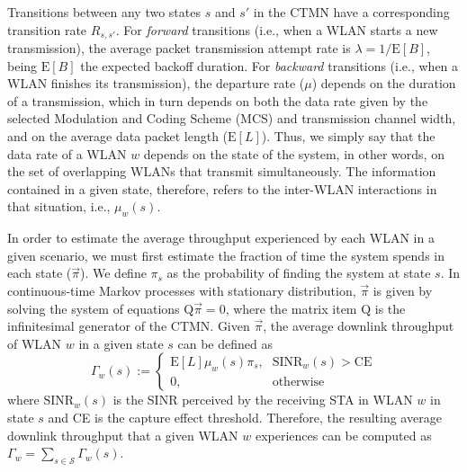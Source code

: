 \documentclass[preprint,12pt]{elsarticle}
\begin{document}
Transitions between any two states $s$ and $s'$ in the CTMN have a corresponding transition rate $R_{s,s'}$. For \textit{forward} transitions (i.e., when a WLAN starts a new transmission), the average packet transmission attempt rate is $\lambda = 1/\text{E}[B]$, being $\text{E}[B]$ the expected backoff duration. For \textit{backward} transitions (i.e., when a WLAN finishes its transmission), the departure rate ($\mu$) depends on the duration of a transmission, which in turn depends on both the data rate given by the selected Modulation and Coding Scheme (MCS) and transmission channel width, and on the average data packet length ($\text{E}[L]$). Thus, we simply say that the data rate of a WLAN $w$ depends on the state of the system, in other words, on the set of overlapping WLANs that transmit simultaneously. The information contained in a given state, therefore, refers to the inter-WLAN interactions in that situation, i.e., $\mu_w(s)$.

In order to estimate the average throughput experienced by each WLAN in a given scenario, we must first estimate the fraction of time the system spends in each state ($\vec{\pi}$). We define $\pi_s$ as the probability of finding the system at state $s$. In continuous-time Markov processes with stationary distribution, $\vec{\pi}$ is given by solving the system of equations $\text{Q} \vec{\pi} = 0$, where the matrix item $\text{Q}$ is the infinitesimal generator of the CTMN.
Given $\vec{\pi}$, the average downlink throughput of WLAN $w$ in a given state $s$ can be defined as
\begin{equation*}
\Gamma_{w}(s) := \begin{cases} 
\text{E}[L]  \mu_w(s) \pi_s  \text{,}  & \text{SINR}_{w}(s) > \text{CE} \\
0 \text{,} & \text{otherwise}
\end{cases}
\end{equation*}
where $\text{SINR}_{w}(s)$ is the SINR perceived by the receiving STA in WLAN $w$ in state $s$ and CE is the capture effect threshold.	Therefore, the resulting average downlink throughput that a given WLAN $w$ experiences can be computed as $\Gamma_w = \sum_{s \in \mathcal{S}}^{}\Gamma_{w}(s) $.
\end{document}
